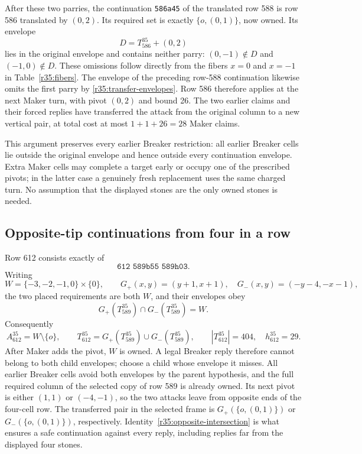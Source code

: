 After these two parries, the continuation \texttt{586a45} of the
translated row 588 is row 586 translated by \((0,2)\).  Its required
set is exactly \(\{o,(0,1)\}\), now owned.  Its envelope
\[
 D=T_{586}^{35}+(0,2)
\]
lies in the original envelope and contains neither parry:
\((0,-1)\notin D\) and \((-1,0)\notin D\).  These omissions follow
directly from the fibers \(x=0\) and \(x=-1\) in
Table~\ref{r35:fibers}.  The envelope of the preceding row-588
continuation likewise omits the first parry by
\eqref{r35:transfer-envelopes}.  Row 586 therefore applies at the next
Maker turn, with pivot \((0,2)\) and bound 26.  The two earlier claims
and their forced replies have transferred the attack from the original
column to a new vertical pair, at total cost at most
\(1+1+26=28\) Maker claims.

This argument preserves every earlier Breaker restriction: all earlier
Breaker cells lie outside the original envelope and hence outside every
continuation envelope.  Extra Maker cells may complete a target early
or occupy one of the prescribed pivots; in the latter case a genuinely
fresh replacement uses the same charged turn.  No assumption that the
displayed stones are the only owned stones is needed.

\subsection{Opposite-tip continuations from four in a row}
\label{r35:opposite}

Row 612 consists exactly of
\[
 \texttt{612 589b55 589h03}.
\]
Writing
\[
 W=\{-3,-2,-1,0\}\times\{0\},\qquad
 G_+(x,y)=(y+1,x+1),\quad
 G_-(x,y)=(-y-4,-x-1),
\]
the two placed requirements are both \(W\), and their envelopes obey
\begin{equation}\label{r35:opposite-intersection}
 G_+(T_{589}^{35})\cap G_-(T_{589}^{35})=W.
\end{equation}
Consequently
\[
 A_{612}^{35}=W\setminus\{o\},\qquad
 T_{612}^{35}=G_+(T_{589}^{35})\cup G_-(T_{589}^{35}),\qquad
 |T_{612}^{35}|=404,\quad h_{612}^{35}=29.
\]
After Maker adds the pivot, \(W\) is owned.  A legal Breaker reply
therefore cannot belong to both child envelopes; choose a child whose
envelope it misses.  All earlier Breaker cells avoid both envelopes by
the parent hypothesis, and the full required column of the selected
copy of row 589 is already owned.  Its next pivot is either \((1,1)\)
or \((-4,-1)\), so the two attacks leave from opposite ends of the
four-cell row.  The transferred pair in the selected frame is
\(G_+(\{o,(0,1)\})\) or \(G_-(\{o,(0,1)\})\), respectively.
Identity~\eqref{r35:opposite-intersection} is what ensures a safe
continuation against every reply, including replies far from the
displayed four stones.

